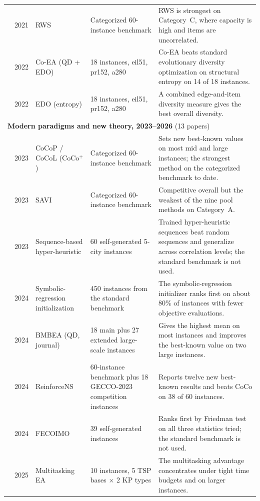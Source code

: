{\begin{longtable}{@{}p{2.8cm}cp{3.0cm}p{4.9cm}p{7.9cm}@{}}
\citet{zhang2021solving} & 2021 & RWS & Categorized 60-instance benchmark & RWS is strongest on Category~C, where capacity is high and items are uncorrelated. \\
\citet{nikfarjam2022coevolutionary} & 2022 & Co-EA (QD + EDO) & 18 instances, eil51, pr152, a280 & Co-EA beats standard evolutionary diversity optimization on structural entropy on 14 of 18 instances. \\
\citet{nikfarjam2022evolutionary} & 2022 & EDO (entropy) & 18 instances, eil51, pr152, a280 & A combined edge-and-item diversity measure gives the best overall diversity. \\
\midrule \multicolumn{5}{l}{\textbf{Modern paradigms and new theory, 2023--2026} (13 papers)} \\ \midrule
\citet{namazi2023solving} & 2023 & CoCoP / CoCoL (CoCo$^+$) & Categorized 60-instance benchmark & Sets new best-known values on most mid and large instances; the strongest method on the categorized benchmark to date. \\
\citet{nguyen2023simulated} & 2023 & SAVI & Categorized 60-instance benchmark & Competitive overall but the weakest of the nine pool methods on Category~A. \\
\citet{rodriguez2023sequence} & 2023 & Sequence-based hyper-heuristic & 60 self-generated 5-city instances & Trained hyper-heuristic sequences beat random sequences and generalize across correlation levels; the standard benchmark is not used. \\
\citet{ni2024leveraging} & 2024 & Symbolic-regression initialization & 450 instances from the standard benchmark & The symbolic-regression initializer ranks first on about 80\% of instances with fewer objective evaluations. \\
\citet{nikfarjam2024use} & 2024 & BMBEA (QD, journal) & 18 main plus 27 extended large-scale instances & Gives the highest mean on most instances and improves the best-known value on two large instances. \\
\citet{wu2024reinforcens} & 2024 & ReinforceNS & 60-instance benchmark plus 18 GECCO-2023 competition instances & Reports twelve new best-known results and beats CoCo on 38 of 60 instances. \\
\citet{xiang2024five} & 2024 & FECOIMO & 39 self-generated instances & Ranks first by Friedman test on all three statistics tried; the standard benchmark is not used. \\
\citet{pathirage2025evolutionary} & 2025 & Multitasking EA & 10 instances, 5 TSP bases $\times$ 2 KP types & The multitasking advantage concentrates under tight time budgets and on larger instances. \\

\end{longtable}}
